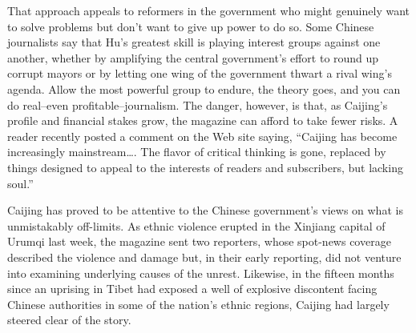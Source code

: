 ﻿\documentclass[12pt]{article}
\begin{document}
That approach appeals to reformers in the government who might genuinely want to solve problems but
don't want to give up power to do so. Some Chinese journalists say that Hu's greatest skill is
playing interest groups against one another, whether by amplifying the central government's effort
to round up corrupt mayors or by letting one wing of the government thwart a rival wing's agenda.
Allow the most powerful group to endure, the theory goes, and you can do real--even
profitable--journalism. The danger, however, is that, as Caijing's profile and financial stakes
grow, the magazine can afford to take fewer risks. A reader recently posted a comment on the Web
site saying, ``Caijing has become increasingly mainstream\ldots . The flavor of critical thinking is
gone, replaced by things designed to appeal to the interests of readers and subscribers, but lacking
soul.''

Caijing has proved to be attentive to the Chinese government's views on what is unmistakably
off-limits. As ethnic violence erupted in the Xinjiang capital of Urumqi last week, the magazine
sent two reporters, whose spot-news coverage described the violence and damage but, in their early
reporting, did not venture into examining underlying causes of the unrest. Likewise, in the fifteen
months since an uprising in Tibet had exposed a well of explosive discontent facing Chinese
authorities in some of the nation's ethnic regions, Caijing had largely steered clear of the story.
\end{document}
